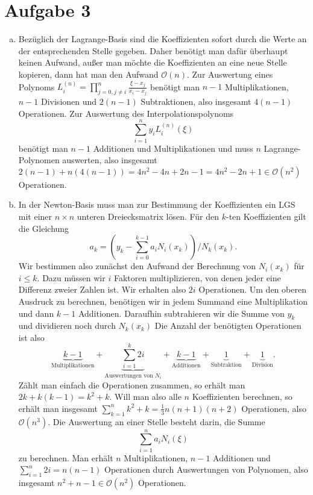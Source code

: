 \documentclass{article}
\theoremstyle{definition}
\begin{document}
\section*{Aufgabe 3}
\begin{enumerate}[(a)]
    \item Bezüglich der Lagrange-Basis sind die Koeffizienten sofort durch die Werte an der entsprechenden Stelle gegeben. Daher benötigt man dafür überhaupt keinen Aufwand, außer man möchte die Koeffizienten an eine neue Stelle kopieren, dann hat man den Aufwand $\mathcal{O}(n)$. Zur Auswertung eines Polynoms $L_i^{(n)} = \prod_{j=0,j\neq i}^n \frac{\xi - x_j}{x_i-x_j}$ benötigt man $n-1$ Multiplikationen, $n-1$ Divisionen und $2(n-1)$ Subtraktionen, also insgesamt $4(n-1)$ Operationen. Zur Auswertung des Interpolationspolynoms \[\sum_{i = 1}^{n}y_iL_i^{(n)}(\xi)\] benötigt man $n-1$ Additionen und Multiplikationen und muss $n$ Lagrange-Polynomen auswerten, also insgesamt $2(n-1) + n(4(n-1)) = 4n^2 - 4n + 2n - 1 = 4n^2 - 2n + 1\in \mathcal{O}(n^2)$ Operationen.
    \item In der Newton-Basis muss man zur Bestimmung der Koeffizienten ein LGS mit einer $n\times n$ unteren Dreiecksmatrix lösen. Für den $k$-ten Koeffizienten gilt die Gleichung
    \[
        a_k = \left(y_k - \sum_{i = 0}^{k-1}a_iN_i(x_k)\right)/N_k(x_k).  
    \]
    Wir bestimmen also zunächst den Aufwand der Berechnung von $N_i(x_k)$ für $i\le k$. Dazu müssen wir $i$ Faktoren multiplizieren, von denen jeder eine Differenz zweier Zahlen ist. Wir erhalten also $2i$ Operationen. Um den oberen Ausdruck zu berechnen, benötigen wir in jedem Summand eine Multiplikation und dann $k-1$ Additionen. Daraufhin subtrahieren wir die Summe von $y_k$ und dividieren noch durch $N_k(x_k)$ Die Anzahl der benötigten Operationen ist also \[\underbrace{k-1}_{\text{Multiplikationen}} + \underbrace{\sum_{i = 1}^{k}2i}_{\text{Auswertungen von } N_i} + \underbrace{k-1}_{\text{Additionen}} + \underbrace{1}_{\text{Subtraktion}} + \underbrace{1}_{\text{Division}}.\]
    Zählt man einfach die Operationen zusammen, so erhält man $2k + k(k-1) = k^2+k$. Will man also alle $n$ Koeffizienten berechnen, so erhält man insgesamt $\sum_{k = 1}^{n} k^2+k = \frac{1}{3}n(n+1)(n+2)$ Operationen, also $\mathcal{O}(n^3)$.  Die Auswertung an einer Stelle besteht darin, die Summe 
    \[\sum_{i = 1}^{n}a_iN_i(\xi)\] zu berechnen. Man erhält $n$ Multiplikationen, $n-1$ Additionen und $\sum_{i = 1}^{n}2i = n(n-1)$ Operationen durch Auswertungen von Polynomen, also insgesamt $n^2+n-1\in \mathcal{O}(n^2)$ Operationen.

\end{enumerate}
\end{document}
